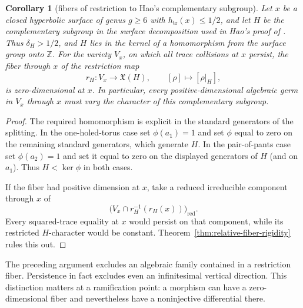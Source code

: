 \documentclass[11pt,reqno]{amsart}
\newtheorem{corollary}[theorem]{Corollary}
\theoremstyle{definition}
\theoremstyle{remark}
\newcommand{\Z}{\mathbb Z}
\newcommand{\Tr}{\operatorname{tr}}
\begin{document}
\begin{corollary}[fibers of restriction to Hao's complementary subgroup]
\label{cor:hao-restriction-fibers}
Let \(x\) be a closed hyperbolic surface of genus \(g\ge6\) with
\(h_{\Tr}(x)\le1/2\), and let \(H\) be the complementary subgroup in the
surface decomposition used in Hao's proof of
\cite[Theorem~A, Proposition~3.2, and (5.1)]{HaoLengthSets}.  Thus
\(\delta_H>1/2\), and \(H\) lies in the
kernel of a homomorphism from the surface group onto \(\Z\).
For the variety \(V_x\), on which all trace collisions at \(x\) persist,
the fiber through \(x\) of the
restriction map
\[
 r_H\colon V_x\longrightarrow\mathfrak X(H),\qquad
 [\rho]\longmapsto[\rho|_H],
\]
is zero-dimensional at \(x\).  In particular, every positive-dimensional
algebraic germ in \(V_x\) through \(x\) must vary the character of this
complementary subgroup.
\end{corollary}

\begin{proof}
The required homomorphism is explicit in the standard generators of the
splitting.  In the one-holed-torus case set
\(\phi(a_1)=1\) and set \(\phi\) equal to zero on the remaining standard
generators, which generate \(H\).  In the pair-of-pants case set
\(\phi(a_2)=1\) and set it equal to zero on the displayed generators of
\(H\) (and on \(a_1\)).  Thus \(H<\ker\phi\) in both cases.

If the fiber had positive dimension at \(x\), take a reduced irreducible
component through \(x\) of
\[
 \bigl(V_x\cap r_H^{-1}(r_H(x))\bigr)_{\mathrm{red}}.
\]
Every squared-trace equality at \(x\) would persist on that component, while
its restricted \(H\)-character would be constant.
Theorem~\ref{thm:relative-fiber-rigidity} rules this out.
\end{proof}

The preceding argument excludes an algebraic family contained in a
restriction fiber.  Persistence in fact excludes even an infinitesimal
vertical direction.  This distinction matters at a ramification point: a
morphism can have a zero-dimensional fiber and nevertheless have a
noninjective differential there.
\end{document}
